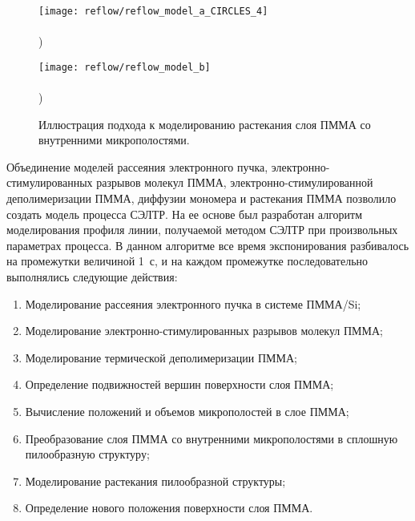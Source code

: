 \begin{figure}[h]
	\begin{minipage}{0.48\textwidth}
		\texttt{[image: reflow/reflow\_model\_a\_CIRCLES\_4]} \\
		\vspace{-28.5ex} \\ ) \\ \vspace{28.5ex}
	\end{minipage}
	\begin{minipage}{0.48\textwidth}
		\texttt{[image: reflow/reflow\_model\_b]} \\
		\vspace{-28.5ex} \\ ) \\ \vspace{28.5ex}
	\end{minipage}
	\vspace{-3.5em}
	\caption{Иллюстрация подхода к моделированию растекания слоя ПММА со внутренними микрополостями.}
	\label{fig:reflow_surface}
\end{figure}

Объединение моделей рассеяния электронного пучка, электронно-стимулированных разрывов молекул ПММА, электронно-стимулированной деполимеризации ПММА, диффузии мономера и растекания ПММА позволило создать модель процесса СЭЛТР. На ее основе был разработан алгоритм моделирования профиля линии, получаемой методом СЭЛТР при произвольных параметрах процесса. В данном алгоритме все время экспонирования разбивалось на промежутки величиной 1~с, и на каждом промежутке последовательно выполнялись следующие действия:

\begin{enumerate}
	\item Моделирование рассеяния электронного пучка в системе ПММА/Si;
	\item Моделирование электронно-стимулированных разрывов молекул ПММА;
	\item Моделирование термической деполимеризации ПММА;
	\item Определение подвижностей вершин поверхности слоя ПММА;
	\item Вычисление положений и объемов микрополостей в слое ПММА;
	\item Преобразование слоя ПММА со внутренними микрополостями в сплошную пилообразную структуру;
	\item Моделирование растекания пилообразной структуры;
	\item Определение нового положения поверхности слоя ПММА.
\end{enumerate}

